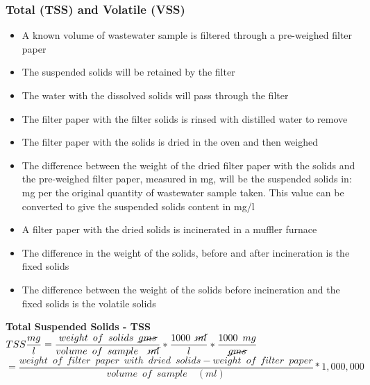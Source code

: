 	\subsubsection{Total (TSS) and Volatile (VSS)}
\begin{itemize}
\setlength\itemsep{1em}
					\item A known volume of wastewater sample is filtered through a pre-weighed filter paper
					\item The suspended solids will be retained by the filter
					\item The water with the dissolved solids will pass through the filter
					\item The filter paper with the filter solids is rinsed with distilled water to remove 
					\item The filter paper with the solids is dried in the oven and then weighed
					\item The difference between the weight of the dried filter paper with the solids and the pre-weighed filter paper, measured in mg, will be the suspended solids in: mg per the original quantity of wastewater sample taken.  This value can be converted to give the suspended solids content in mg/l
					\item A filter paper with the dried solids is incinerated in a muffler furnace
					\item The difference in the weight of the solids, before and after incineration is the fixed solids
					\item The difference between the weight of the solids before incineration and the fixed solids is the volatile solids
	\end{itemize}				

\textbf{Total Suspended Solids - TSS}
\vspace{0.4cm}
$TSS \dfrac{mg}{l}=\dfrac{weight \enspace of \enspace solids \enspace \cancel{gms}}{volume \enspace of \enspace sample \enspace \enspace \cancel{ml}}*\dfrac{1000 \enspace \cancel{ml}}{l}*\dfrac{1000 \enspace mg}{\cancel{gms}}$\\
\vspace{0.3cm}
\hspace{1.4cm}$=\dfrac{weight \enspace of \enspace filter \enspace paper  \enspace with \enspace dried  \enspace solids - weight \enspace of \enspace filter \enspace paper}{volume \enspace of \enspace sample \enspace \enspace (ml)}*1,000,000$\\
\vspace{0.4cm}

